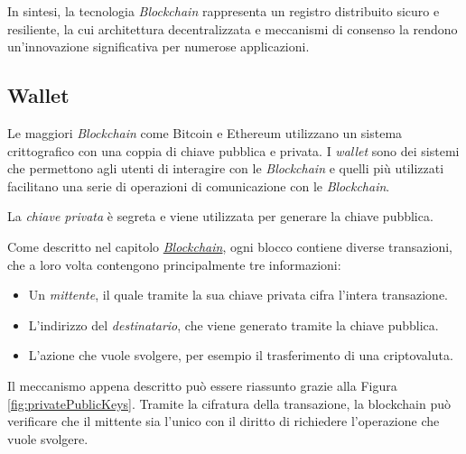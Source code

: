 In sintesi, la tecnologia \textit{Blockchain} rappresenta un registro distribuito sicuro e resiliente, la cui architettura decentralizzata e meccanismi di consenso la rendono un'innovazione significativa per numerose applicazioni.

\subsection{Wallet}
\label{sec:wallet}

Le maggiori \textit{Blockchain} come Bitcoin e Ethereum utilizzano un sistema crittografico con una coppia di chiave pubblica e privata. I \textit{wallet} sono dei sistemi che permettono agli utenti di interagire con le \textit{Blockchain} e quelli più utilizzati facilitano una serie di operazioni di comunicazione con le \textit{Blockchain}. \cite{ledger-privatekey}
        
La \textit{chiave privata} è segreta e viene utilizzata per generare la chiave pubblica. \cite{bitpanda-privatekey}

Come descritto nel capitolo \hyperref[sec:blockchain]{\textit{Blockchain}}, ogni blocco contiene diverse transazioni, che a loro volta contengono principalmente tre informazioni:
\begin{itemize}
    \item Un \textit{mittente}, il quale tramite la sua chiave privata cifra l'intera transazione. 
    \item L'indirizzo del \textit{destinatario}, che viene generato tramite la chiave pubblica.
    \item L'azione che vuole svolgere, per esempio il trasferimento di una criptovaluta.
\end{itemize}

Il meccanismo appena descritto può essere riassunto grazie alla Figura \ref{fig:privatePublicKeys}. \cite{ledger-privatekey}
Tramite la cifratura della transazione, la blockchain può verificare che il mittente sia l'unico con il diritto di richiedere l'operazione che vuole svolgere. \cite{bitpanda-privatekey}

